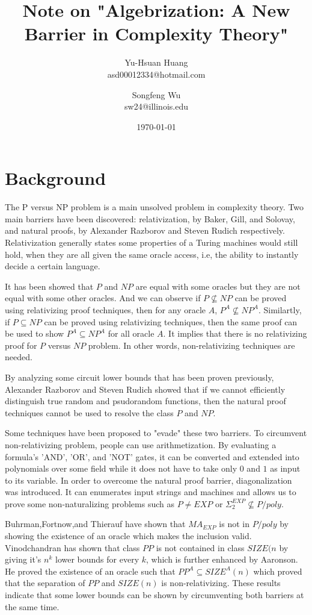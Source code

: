 \documentclass{article}
\title{Note on "Algebrization: A New Barrier in Complexity Theory"}
\author{Yu-Hsuan Huang\\asd00012334@hotmail.com \and Songfeng Wu\\sw24@illinois.edu}
\date{\today}
\begin{document}
\maketitle

\section{Background}


The P versus NP problem is a main unsolved problem in complexity theory. Two main barriers have been discovered: relativization, by Baker, Gill, and Solovay\cite{baker1975relativizations}, and natural proofs, by Alexander Razborov and Steven Rudich\cite{razborov1997natural} respectively. Relativization generally states some properties of a Turing machines would still hold, when they are all given the same oracle access, i.e, the ability to instantly decide a certain language.

It has been showed that $P$ and $NP$ are equal with some oracles but they are not equal with some other oracles. And we can observe if $P \not\subseteq NP$ can be proved using relativizing proof techniques, then for any oracle $A$, $P^A \not\subseteq NP^A$. Similartly, if $P \subseteq NP$ can be proved using relativizing techniques, then the same proof can be used to show $P^A \subseteq NP^A$ for all oracle $A$. It implies that there is no relativizing proof for $P$ versus $NP$ problem. In other words, non-relativizing techniques are needed.

By analyzing some circuit lower bounds that has been proven previously, Alexander Razborov and Steven Rudich\cite{razborov1997natural} showed that if we cannot efficiently distinguish true random and psudorandom functions, then the natural proof techniques cannot be used to resolve the class $P$ and $NP$.

Some techniques have been proposed to "evade" these two barriers. To circumvent non-relativizing problem, people can use arithmetization. By evaluating a formula's 'AND', 'OR', and 'NOT' gates, it can be converted and extended into polynomials over some field while it does not have to take only $0$ and $1$ as input to its variable. In order to overcome the natural proof barrier, diagonalization was introduced. It can enumerates input strings and machines and allows us to prove some non-naturalizing problems such as $P\neq EXP$ or $\Sigma^{EXP}_2 \not\subseteq P/poly$. 

Buhrman,Fortnow,and Thierauf \cite{buhrman1998nonrelativizing} have shown that $MA_{EXP}$ is not in $P/poly$ by showing the existence of an oracle which makes the inclusion valid. Vinodchandran\cite{vinodchandran2005note} has shown that class $PP$ is not contained in class $SIZE(n$ by giving it's $n^k$ lower bounds for every $k$, which is further enhanced by Aaronson. He proved the existence of an oracle such that $PP^{A} \subseteq SIZE^A(n)$ which proved that the separation of $PP$ and $SIZE(n)$ is non-relativizing. These results indicate that some lower bounds can be shown by circumventing both barriers at the same time. 
\end{document}
